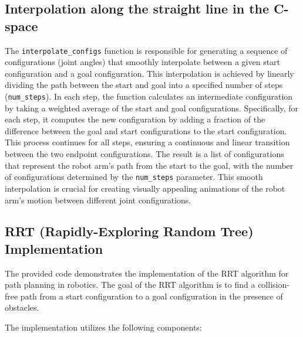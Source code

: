 \documentclass{article}
\begin{document}
\subsection{Interpolation along the straight line in the C-space}
The \texttt{interpolate\_configs} function is responsible for generating a sequence of configurations (joint angles) that smoothly interpolate between a given start configuration and a goal configuration. This interpolation is achieved by linearly dividing the path between the start and goal into a specified number of steps (\texttt{num\_steps}). In each step, the function calculates an intermediate configuration by taking a weighted average of the start and goal configurations. Specifically, for each step, it computes the new configuration by adding a fraction of the difference between the goal and start configurations to the start configuration. This process continues for all steps, ensuring a continuous and linear transition between the two endpoint configurations. The result is a list of configurations that represent the robot arm's path from the start to the goal, with the number of configurations determined by the \texttt{num\_steps} parameter. This smooth interpolation is crucial for creating visually appealing animations of the robot arm's motion between different joint configurations.

\subsection{RRT (Rapidly-Exploring Random Tree) Implementation}

The provided code demonstrates the implementation of the RRT algorithm for path planning in robotics. The goal of the RRT algorithm is to find a collision-free path from a start configuration to a goal configuration in the presence of obstacles.

The implementation utilizes the following components:
\end{document}
